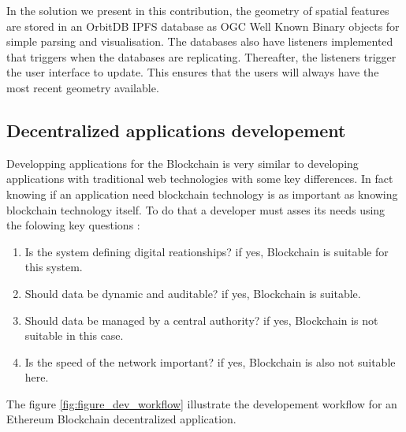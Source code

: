 \documentclass{isprs} %
\begin{document}
In the solution we present in this contribution, the geometry of spatial features are stored in an OrbitDB IPFS database as OGC Well Known Binary objects for simple parsing and visualisation. The databases also have listeners implemented that triggers when the databases are replicating. Thereafter, the listeners trigger the user interface to update. This ensures that the users will always have the most recent geometry available.

\subsection{Decentralized applications developement}\label{sec:Decentralized applications developement}

Developping applications for the Blockchain is very similar to developing applications with traditional web technologies with some key differences. In fact knowing if an application need blockchain technology is as important as knowing blockchain technology itself. To do that a developer must asses its needs using the folowing key questions :

\begin{enumerate}
\setlength\itemsep{0em}\setlength\parskip{0em}\setlength\topsep{0em}\setlength\partopsep{0em}\setlength\parsep{0em} 
\item{Is the system defining digital reationships? if yes, Blockchain is suitable for this system.} 
\item{Should data be dynamic and auditable? if yes, Blockchain is suitable.}
\item{Should data be managed by a central authority? if yes, Blockchain is not suitable in this case.}
\item{Is the speed of the network important? if yes, Blockchain is also not suitable here.}
\end{enumerate}

The figure \ref{fig:figure_dev_workflow} illustrate the developement workflow for an Ethereum Blockchain decentralized application.
\end{document}
